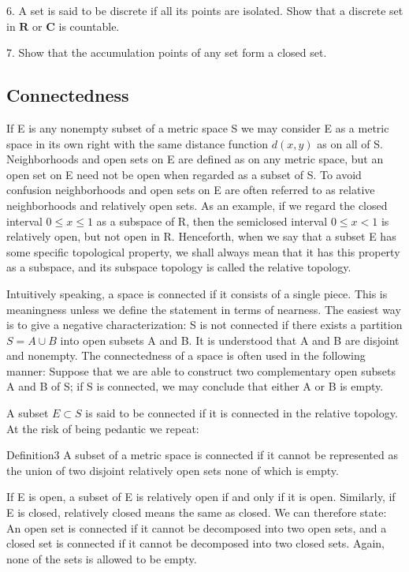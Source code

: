 6. A set is said to be discrete if all its points are isolated. Show that a discrete set in $\mathbf{R}$ or $\mathbf{C}$ is countable.

7. Show that the accumulation points of any set form a closed set.


\setcounter{section}{1}\setcounter{subsection}{2}\subsection{Connectedness}\label{sec:3.1.3}
If E is any nonempty subset of a metric space S we may consider E as a metric space in its own right with the same distance function $d(x,y)$ as on all of S. Neighborhoods and open sets on E are defined as on any metric space, but an open set on E need not be open when regarded as a subset of S. To avoid confusion neighborhoods and open sets on E are often referred to as relative neighborhoods and relatively open sets. As an example, if we regard the closed interval $0 \leq x \leq 1$ as a subspace of R, then the semiclosed interval $0 \leq x < 1$ is relatively open, but not open in R. Henceforth, when we say that a subset E has some specific topological property, we shall always mean that it has this property as a subspace, and its subspace topology is called the relative topology.

Intuitively speaking, a space is connected if it consists of a single piece. This is meaningness unless we define the statement in terms of nearness. The easiest way is to give a negative characterization: S is not connected if there exists a partition $S = A \cup B$ into open subsets A and B. It is understood that A and B are disjoint and nonempty. The connectedness of a space is often used in the following manner: Suppose that we are able to construct two complementary open subsets A and B of S; if S is connected, we may conclude that either A or B is empty.

A subset $E \subset S$ is said to be connected if it is connected in the relative topology. At the risk of being pedantic we repeat:

\begin{originalstatement}{Definition}{3}\label{def:3.3}
A subset of a metric space is connected if it cannot be represented as the union of two disjoint relatively open sets none of which is empty.
\end{originalstatement}
If E is open, a subset of E is relatively open if and only if it is open. Similarly, if E is closed, relatively closed means the same as closed. We can therefore state: An open set is connected if it cannot be decomposed into two open sets, and a closed set is connected if it cannot be decomposed into two closed sets. Again, none of the sets is allowed to be empty.

